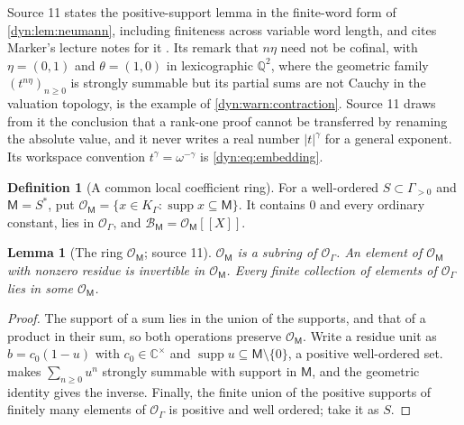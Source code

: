 \documentclass[11pt,letterpaper]{article}
\newtheorem{lemma}[lemma]{Lemma}
\theoremstyle{definition}
\newtheorem{definition}[definition]{Definition}
\theoremstyle{remark}
\newcommand{\C}{\mathbb C}
\newcommand{\Q}{\mathbb Q}
\newcommand{\OO}{\mathcal O}
\newcommand{\BB}{\mathscr B}
\newcommand{\supp}{\operatorname{supp}}
\numberwithin{equation}{section}
\begin{document}
Source 11 states the positive-support lemma in the finite-word form of
\cref{dyn:lem:neumann}, including finiteness across variable word length,
and cites Marker's lecture notes for it \cite[Lemma~2.36]{Marker}. Its
remark that $n\eta$ need not be cofinal, with $\eta=(0,1)$ and
$\theta=(1,0)$ in lexicographic $\Q^{2}$, where the geometric family
$(t^{n\eta})_{n\ge0}$ is strongly summable but its partial sums are not
Cauchy in the valuation topology, is the example of
\cref{dyn:warn:contraction}. Source 11 draws from it the conclusion that a
rank-one proof cannot be transferred by renaming the absolute value, and it
never writes a real number $|t|^{\gamma}$ for a general exponent. Its
workspace convention $t^{\gamma}=\omega^{-\gamma}$ is
\eqref{dyn:eq:embedding}.

\begin{definition}[A common local coefficient ring]
\label{dyn:rd:def:ring}
For a well-ordered $S\subset\Gamma_{>0}$ and $\mathsf M=S^{*}$, put
$\OO_{\mathsf M}=\{x\in K_\Gamma:\supp x\subseteq\mathsf M\}$. It contains
$0$ and every ordinary constant, lies in $\OO_\Gamma$, and
$\BB_{\mathsf M}=\OO_{\mathsf M}[[X]]$.
\end{definition}

\begin{lemma}[The ring $\OO_{\mathsf M}$; source 11]\label{dyn:rd:lem:ring}
$\OO_{\mathsf M}$ is a subring of $\OO_\Gamma$. An element of
$\OO_{\mathsf M}$ with nonzero residue is invertible in $\OO_{\mathsf M}$.
Every finite collection of elements of $\OO_\Gamma$ lies in some
$\OO_{\mathsf M}$.
\end{lemma}
\begin{proof}
The support of a sum lies in the union of the supports, and that of a
product in their sum, so both operations preserve $\OO_{\mathsf M}$. Write a
residue unit as $b=c_0(1-u)$ with $c_0\in\C^{\times}$ and
$\supp u\subseteq\mathsf M\setminus\{0\}$, a positive well-ordered set.
 makes $\sum_{n\ge0}u^{n}$ strongly summable with
support in $\mathsf M$, and the geometric identity gives the inverse.
Finally, the finite union of the positive supports of finitely many elements
of $\OO_\Gamma$ is positive and well ordered; take it as $S$.
\end{proof}
\end{document}
